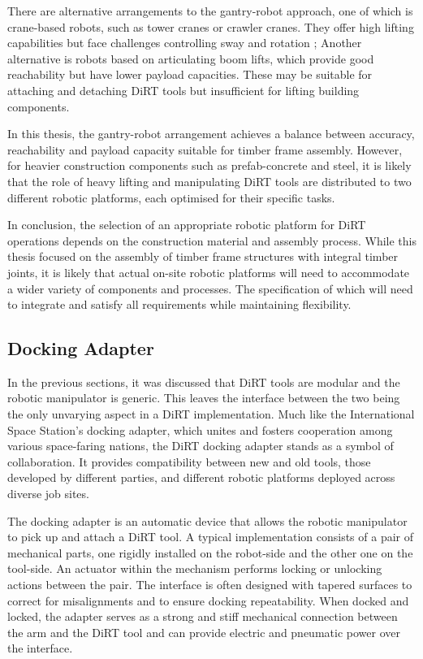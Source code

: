 There are alternative arrangements to the gantry-robot approach, one of which is crane-based robots, such as tower cranes or crawler cranes. They offer high lifting capabilities but face challenges controlling sway \parencite{neupertTrackingAntiswayControl2010} and rotation \parencite{liangRASRoboticAssembly2017}; Another alternative is robots based on articulating boom lifts, which provide good reachability but have lower payload capacities. These may be suitable for attaching and detaching DiRT tools but insufficient for lifting building components. 

In this thesis, the gantry-robot arrangement achieves a balance between accuracy, reachability and payload capacity suitable for timber frame assembly. However, for heavier construction components such as prefab-concrete and steel, it is likely that the role of heavy lifting and manipulating DiRT tools are distributed to two different robotic platforms, each optimised for their specific tasks.

In conclusion, the selection of an appropriate robotic platform for DiRT operations depends on the construction material and assembly process. While this thesis focused on the assembly of timber frame structures with integral timber joints, it is likely that actual on-site robotic platforms will need to accommodate a wider variety of components and processes. The specification of which will need to integrate and satisfy all requirements while maintaining flexibility.

\FloatBarrier

\subsection{Docking Adapter}
\label{subsection:discussion-docking-adapter}

In the previous sections, it was discussed that DiRT tools are modular and the robotic manipulator is generic. This leaves the interface between the two being the only unvarying aspect in a DiRT implementation. Much like the International Space Station's docking adapter, which unites and fosters cooperation among various space-faring nations, the DiRT docking adapter stands as a symbol of collaboration. It provides compatibility between new and old tools, those developed by different parties, and different robotic platforms deployed across diverse job sites.

The docking adapter is an automatic device that allows the robotic manipulator to pick up and attach a DiRT tool. A typical implementation consists of a pair of mechanical parts, one rigidly installed on the robot-side and the other one on the tool-side. An actuator within the mechanism performs locking or unlocking actions between the pair. The interface is often designed with tapered surfaces to correct for misalignments and to ensure docking repeatability. When docked and locked, the adapter serves as a strong and stiff mechanical connection between the arm and the DiRT tool and can provide electric and pneumatic power over the interface.

